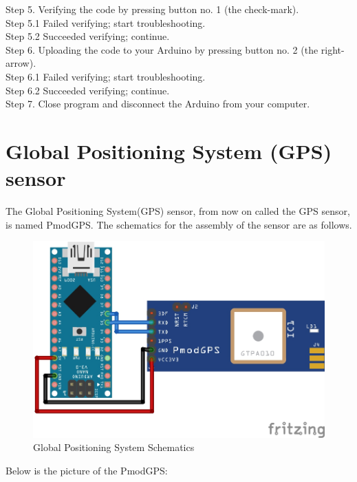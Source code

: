 \documentclass{report}
\begin{document}
Step 5. Verifying the code by pressing button no. 1 (the check-mark). \\
Step 5.1 Failed verifying; start troubleshooting. \\
Step 5.2 Succeeded verifying; continue. \\
Step 6. Uploading the code to your Arduino by pressing button no. 2 (the right-arrow). \\
Step 6.1 Failed verifying; start troubleshooting. \\
Step 6.2 Succeeded verifying; continue. \\
Step 7. Close program and disconnect the Arduino from your computer. \\

\chapter{Global Positioning System (GPS) sensor}
The Global Positioning System(GPS) sensor, from now on called the GPS sensor, is named PmodGPS. The schematics for the assembly of the sensor are as follows. \\

\begin{figure}[H]
\begin{center}
\includegraphics[scale=1]{images/GPS.jpg}
\caption{Global Positioning System Schematics}	
\end{center}
\end{figure}
\newpage
Below is the picture of the PmodGPS: \\
\end{document}
